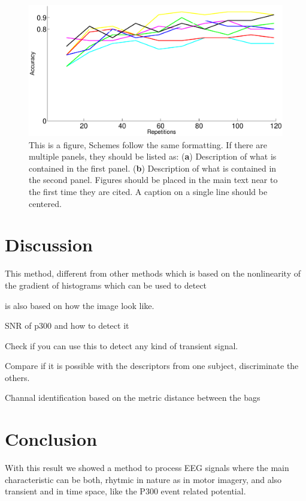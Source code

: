 \documentclass[entropy,article,submit,moreauthors,pdftex,10pt,a4paper]{mdpi}
\begin{document}
\begin{figure}[H]
\centering
\includegraphics[width=18cm]{singletriality.eps}
\caption{This is a figure, Schemes follow the same formatting. If there are multiple panels, they should be listed as: (\textbf{a}) Description of what is contained in the first panel. (\textbf{b}) Description of what is contained in the second panel. Figures should be placed in the main text near to the first time they are cited. A caption on a single line should be centered.}
\label{fig:singletrial}
\end{figure}

\section{Discussion}

This method, different from other methods which is based on the nonlinearity of the gradient of histograms which can be used to detect 

is also based on how the image look like.

SNR of p300 and how to detect it

Check if you can use this to detect any kind of transient signal.

Compare if it is possible with the descriptors from one subject, discriminate the others.

Channal identification based on the metric distance between the bags


\section{Conclusion}

With this result we showed a method to process EEG signals where the main characteristic can be both, rhytmic in nature as in motor imagery, and also transient and in time space, like the P300 event related potential.
\end{document}
